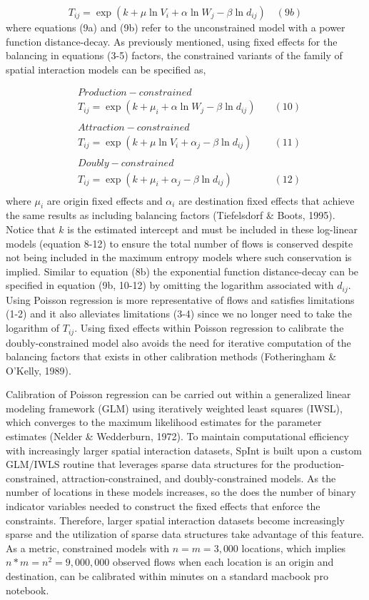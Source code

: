 \documentclass[11pt]{article}
\begin{document}
\[T_{ij} = \exp(k + \mu \ln V_{i} + \alpha \ln W_{j} - \beta \ln d_{ij}) \quad (9b) \]
%
where equations (9a) and (9b) refer to the unconstrained model with a
power function distance-decay. As previously mentioned, using fixed
effects for the balancing in equations (3-5) factors, the constrained
variants of the family of spatial interaction models can be specified
as,

\[
\begin{align}
&Production-constrained \\
&T_{ij} = \exp(k + \mu_{i} + \alpha \ln W_{j} - \beta \ln d_{ij}) \quad & (10) \\
\\
&Attraction-constrained \\
&T_{ij} = \exp(k + \mu \ln V_{i} + \alpha_{j} - \beta \ln d_{ij}) \quad & (11) \\
\\
&Doubly-constrained \\
&T_{ij} = \exp(k + \mu_{i} + \alpha_{j} - \beta \ln d_{ij}) \quad & (12) \\
\end{align}
\]
%
where \(\mu_{i}\) are origin fixed effects and \(\alpha_{i}\) are
destination fixed effects that achieve the same results as including
balancing factors (Tiefelsdorf \& Boots, 1995). Notice that $k$ is the estimated intercept and must be included in these log-linear models (equation 8-12) to ensure the total number of flows is conserved despite not being included in the maximum entropy models where such conservation is implied. Similar to equation (8b) the exponential function
distance-decay can be specified in equation (9b, 10-12) by omitting the
logarithm associated with \(d_{ij}\). Using Poisson regression is more
representative of flows and satisfies limitations (1-2) and it also
alleviates limitations (3-4) since we no longer need to take the
logarithm of \(T_{ij}\). Using fixed effects within Poisson regression
to calibrate the doubly-constrained model also avoids the need for
iterative computation of the balancing factors that exists in other
calibration methods (Fotheringham \& O'Kelly, 1989).

Calibration of Poisson regression can be carried out within a
generalized linear modeling framework (GLM) using iteratively weighted
least squares (IWSL), which converges to the maximum likelihood
estimates for the parameter estimates (Nelder \& Wedderburn, 1972). To
maintain computational efficiency with increasingly larger spatial
interaction datasets, SpInt is built upon a custom GLM/IWLS routine that
leverages sparse data structures for the production-constrained,
attraction-constrained, and doubly-constrained models. As the number of
locations in these models increases, so the does the number of binary
indicator variables needed to construct the fixed effects that enforce
the constraints. Therefore, larger spatial interaction datasets become
increasingly sparse and the utilization of sparse data structures take
advantage of this feature. As a metric, constrained models with
\(n = m = 3,000\) locations, which implies \(n*m = n^2 = 9,000,000\)
observed flows when each location is an origin and destination, can be
calibrated within minutes on a standard macbook pro notebook.
\end{document}
